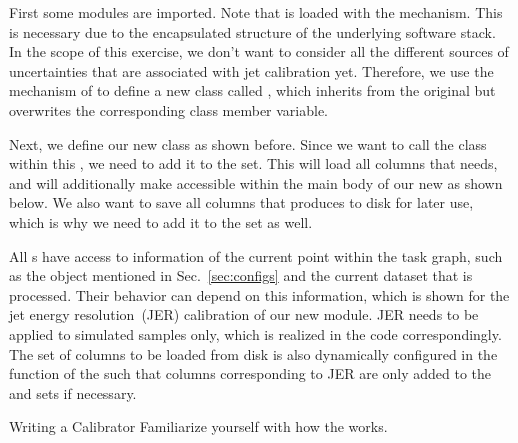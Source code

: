 First some modules are imported. Note that  is loaded with
the  mechanism.
This is necessary due to the encapsulated structure of the underlying software stack.
In the scope of this exercise, we don't want to consider all the different sources of uncertainties that are associated with jet calibration yet.
Therefore, we use the  mechanism of  to define a new class called , which inherits from the original   but overwrites the corresponding class member variable.

Next, we define our new  class  as shown before.
Since we want to call the  class within this , we need to add it to the  set.
This will load all columns that  needs, and will additionally make  accessible within the main body of our new  as shown below.
We also want to save all columns that  produces to disk for later use, which is why we need to add it to the  set as well.

All s have access to information of the current point within the task graph, such as the  object mentioned in Sec.~\ref{sec:configs} and the current dataset that is processed.
Their behavior can depend on this information, which is shown for the jet energy resolution~(JER) calibration of our new  module.
JER needs to be applied to simulated samples only, which is realized in the code correspondingly.
The set of columns to be loaded from disk is also dynamically configured in the  function of the   such that columns corresponding to JER are only added to the  and  sets if necessary.

\begin{exercise}{Writing a Calibrator}%
	Familiarize yourself with how the   works.
\end{exercise}
